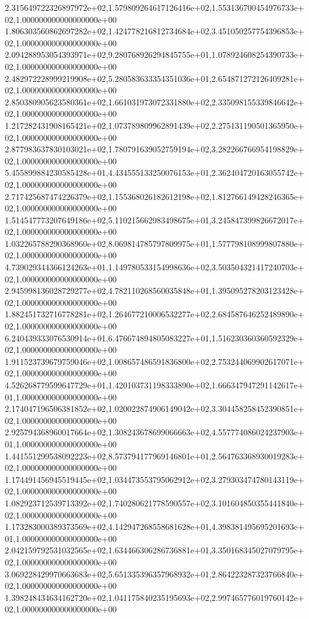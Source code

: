 2.315649722326897972e+02,1.579809264617126416e+02,1.553136700454976733e+02,1.000000000000000000e+00
1.806303560862697282e+02,1.424778216812734684e+02,3.451050257754396853e+02,1.000000000000000000e+00
2.094288953054393971e+02,9.280768926294845755e+01,1.078924608254390733e+02,1.000000000000000000e+00
2.482972228999219908e+02,5.280583633354351036e+01,2.654871272126409281e+02,1.000000000000000000e+00
2.850380905623580361e+02,1.661031973072331880e+02,2.335098155339846642e+02,1.000000000000000000e+00
1.217282431908165421e+02,1.073789809962891439e+02,2.275131190501365950e+02,1.000000000000000000e+00
2.877983637830103021e+02,1.780791639052759194e+02,3.282266766954198829e+02,1.000000000000000000e+00
5.455899884230585428e+01,4.434555133250076153e+01,2.362404720163055742e+02,1.000000000000000000e+00
2.717425687474226379e+02,1.155368026182612198e+02,1.812766149428246365e+02,1.000000000000000000e+00
1.514547773207649186e+02,5.110215662983498675e+01,3.245847399826672017e+02,1.000000000000000000e+00
1.032265788290368960e+02,8.069814785797809975e+01,1.577798108999807880e+02,1.000000000000000000e+00
4.739029344366124263e+01,1.149780533154998636e+02,3.503504321417240703e+02,1.000000000000000000e+00
2.945998136028729277e+02,4.782110268560035848e+01,1.395095278203123428e+02,1.000000000000000000e+00
1.882451732716778281e+02,1.264677210006532277e+02,2.684587646252489890e+02,1.000000000000000000e+00
6.240439333076530914e+01,6.476674894805083227e+01,1.516230360360592329e+02,1.000000000000000000e+00
1.911523739679759046e+02,1.008657486591836800e+02,2.753244069902617071e+02,1.000000000000000000e+00
4.526268779599647729e+01,1.420103731198333890e+02,1.666347947291142617e+01,1.000000000000000000e+00
2.174047196506381852e+02,1.020022874906149042e+02,3.304458258452390851e+02,1.000000000000000000e+00
2.925794368960017664e+02,1.308243678699066663e+02,4.557774086024237903e+01,1.000000000000000000e+00
1.441551299538092223e+02,8.573794177969146801e+01,2.564763368930019283e+02,1.000000000000000000e+00
1.174491456945519445e+02,1.034473553795062912e+02,3.279303474780143119e+02,1.000000000000000000e+00
1.082923712539713392e+02,1.740280621778590557e+02,3.101604850355441840e+02,1.000000000000000000e+00
1.173283000389373569e+02,4.142947268558681628e+01,4.398381495695201693e+01,1.000000000000000000e+00
2.042159792531032565e+02,1.634466306286736881e+01,3.350168345027079795e+02,1.000000000000000000e+00
3.069228429970663683e+02,5.651335396357968932e+01,2.864223287323766840e+02,1.000000000000000000e+00
1.398248434634162720e+02,1.041175840235195693e+02,2.997465776019760142e+02,1.000000000000000000e+00

